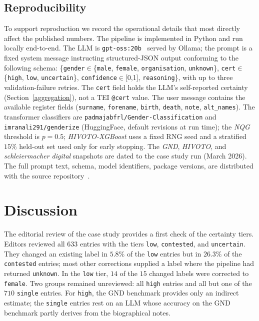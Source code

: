 \documentclass{eceasst}
\begin{document}
\subsection{Reproducibility} To support reproduction we record the operational details that most directly affect the published numbers. The pipeline is implemented in Python and run locally end-to-end. The LLM is \texttt{gpt-oss:20b}~\cite{openai_gpt-oss-120b_2025} served by Ollama; the prompt is a fixed system message instructing structured-JSON output conforming to the following schema: \{\texttt{gender}$\in$\{\texttt{male}, \texttt{female}, \texttt{organisation},
\texttt{unknown}\}, \texttt{cert}$\in$\{\texttt{high}, \texttt{low},
\texttt{uncertain}\}, \texttt{confidence}$\in$[0,1], \newline\texttt{reasoning}\},
with up to three validation-failure retries. The \texttt{cert} field holds the LLM's self-reported certainty (Section~\ref{aggregation}), not a TEI \texttt{@cert} value. The user message contains the available register fields (\texttt{surname}, \texttt{forename}, \texttt{birth}, \texttt{death}, \texttt{note}, \texttt{alt\_names}). The transformer classifiers are \texttt{padmajabfrl/Gender-Classification} and \texttt{imranali291/\newline genderize} (HuggingFace, default revisions at run time); the \textit{NQG} threshold is $p = 0.5$; \textit{HIVOTO-XGBoost} uses a fixed RNG seed and a stratified $15\%$ held-out set used only for early stopping. The \textit{GND}, \textit{HIVOTO}, and \textit{schleiermacher digital} snapshots are dated to the case study run (March 2026). The full prompt text, schema, model identifiers, package versions, are distributed with the source repository~\cite{gendertagger_software_2026}.


\section{Discussion}
\label{sec:discussion}

The editorial review of the case study provides a first check of the certainty tiers. Editors reviewed all $633$ entries with the tiers \texttt{low}, \texttt{contested}, and \texttt{uncertain}. They changed an existing label in $5.8\%$ of the \texttt{low} entries but in $26.3\%$ of the \texttt{contested} entries; most other corrections supplied a label where the pipeline had returned \texttt{unknown}. In the \texttt{low} tier, $14$ of the $15$ changed labels were corrected to \texttt{female}. Two groups remained unreviewed: all \texttt{high} entries and all but one of the $710$ \texttt{single} entries. For \texttt{high}, the GND benchmark provides only an indirect estimate; the \texttt{single} entries rest on an LLM whose accuracy on the GND benchmark partly derives from the biographical notes.
\end{document}
